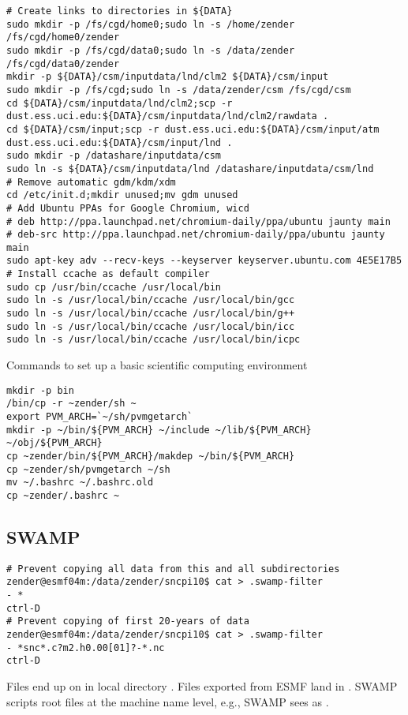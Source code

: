 \documentclass[12pt,twoside]{article}
\begin{document}
\begin{verbatim}
# Create links to directories in ${DATA}
sudo mkdir -p /fs/cgd/home0;sudo ln -s /home/zender /fs/cgd/home0/zender
sudo mkdir -p /fs/cgd/data0;sudo ln -s /data/zender /fs/cgd/data0/zender
mkdir -p ${DATA}/csm/inputdata/lnd/clm2 ${DATA}/csm/input
sudo mkdir -p /fs/cgd;sudo ln -s /data/zender/csm /fs/cgd/csm
cd ${DATA}/csm/inputdata/lnd/clm2;scp -r dust.ess.uci.edu:${DATA}/csm/inputdata/lnd/clm2/rawdata .
cd ${DATA}/csm/input;scp -r dust.ess.uci.edu:${DATA}/csm/input/atm dust.ess.uci.edu:${DATA}/csm/input/lnd .
sudo mkdir -p /datashare/inputdata/csm
sudo ln -s ${DATA}/csm/inputdata/lnd /datashare/inputdata/csm/lnd
# Remove automatic gdm/kdm/xdm
cd /etc/init.d;mkdir unused;mv gdm unused
# Add Ubuntu PPAs for Google Chromium, wicd
# deb http://ppa.launchpad.net/chromium-daily/ppa/ubuntu jaunty main 
# deb-src http://ppa.launchpad.net/chromium-daily/ppa/ubuntu jaunty main 
sudo apt-key adv --recv-keys --keyserver keyserver.ubuntu.com 4E5E17B5
# Install ccache as default compiler
sudo cp /usr/bin/ccache /usr/local/bin
sudo ln -s /usr/local/bin/ccache /usr/local/bin/gcc
sudo ln -s /usr/local/bin/ccache /usr/local/bin/g++
sudo ln -s /usr/local/bin/ccache /usr/local/bin/icc
sudo ln -s /usr/local/bin/ccache /usr/local/bin/icpc
\end{verbatim}

Commands to set up a basic scientific computing environment
\begin{verbatim}
mkdir -p bin
/bin/cp -r ~zender/sh ~
export PVM_ARCH=`~/sh/pvmgetarch`
mkdir -p ~/bin/${PVM_ARCH} ~/include ~/lib/${PVM_ARCH} ~/obj/${PVM_ARCH}
cp ~zender/bin/${PVM_ARCH}/makdep ~/bin/${PVM_ARCH}
cp ~zender/sh/pvmgetarch ~/sh
mv ~/.bashrc ~/.bashrc.old
cp ~zender/.bashrc ~
\end{verbatim}

\subsection{SWAMP}\label{sxn:swamp}
\begin{verbatim}
# Prevent copying all data from this and all subdirectories
zender@esmf04m:/data/zender/sncpi10$ cat > .swamp-filter
- *
ctrl-D
# Prevent copying of first 20-years of data
zender@esmf04m:/data/zender/sncpi10$ cat > .swamp-filter
- *snc*.c?m2.h0.00[01]?-*.nc
ctrl-D
\end{verbatim}
Files end up on  in local directory
.
Files exported from ESMF land in 
.
SWAMP scripts root files at the machine name level, e.g.,
SWAMP sees  as
.
\end{document}
